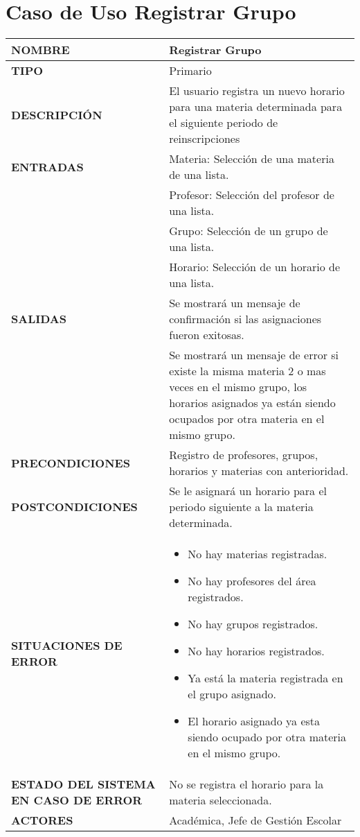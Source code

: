 \newpage
\section{Caso de Uso Registrar Grupo}
\begin{longtable}{ | p{6cm} | p{10cm} |}
\hline
\textbf{NOMBRE} & Registrar Grupo\\
\hline
\textbf{TIPO} & Primario\\
\hline
\textbf{DESCRIPCIÓN} & El usuario registra un nuevo horario para una materia determinada para el siguiente periodo de reinscripciones\\
\hline
\textbf{ENTRADAS} & Materia: Selección de una materia de una lista.\\ & Profesor: Selección del profesor de una lista.\\ & Grupo: Selección de un grupo de una lista.\\ & Horario: Selección de un horario de una lista.\\
\hline
\textbf{SALIDAS} & Se mostrará un mensaje de confirmación si las asignaciones fueron exitosas.\\ & Se mostrará un mensaje de error si existe la misma materia 2 o mas veces en el mismo grupo, los horarios asignados ya están siendo ocupados por otra materia en el mismo grupo.\\
\hline
\textbf{PRECONDICIONES} & Registro de profesores, grupos, horarios y materias con anterioridad.\\
\hline
\textbf{POSTCONDICIONES} & Se le asignará un horario para el periodo siguiente a la materia determinada.\\
\hline
\textbf{SITUACIONES DE ERROR} & \begin{itemize}
    \item No hay materias registradas.
    \item No hay profesores del área registrados.
    \item No hay grupos registrados.
    \item No hay horarios registrados.
    \item Ya está la materia registrada en el grupo asignado.
    \item El horario asignado ya esta siendo ocupado por otra materia en el mismo grupo.
\end{itemize}\\
\hline
\textbf{ESTADO DEL SISTEMA EN CASO DE ERROR} & No se registra el horario para la materia seleccionada.\\
\hline
\textbf{ACTORES} & Académica, Jefe de Gestión Escolar\\
\hline
\end{longtable}
